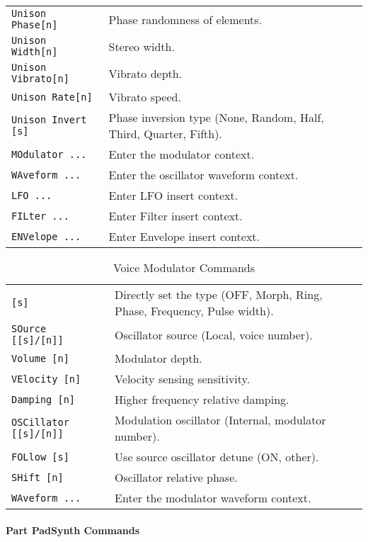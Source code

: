 \begin{table}[H]
\begin{tabular}{l l}
\texttt{Unison Phase[n]} &
   Phase randomness of elements. \\
\texttt{Unison Width[n]} &
   Stereo width. \\
\texttt{Unison Vibrato[n]} &
   Vibrato depth. \\
\texttt{Unison Rate[n]} &
   Vibrato speed. \\
\texttt{Unison Invert [s]} &
   Phase inversion type (None, Random, Half, Third, Quarter, Fifth). \\
\texttt{MOdulator ...} &
   Enter the modulator context. \\
\texttt{WAveform ...} &
   Enter the oscillator waveform context. \\
\texttt{LFO ...} &
   Enter LFO insert context.  \\
\texttt{FILter ...} &
   Enter Filter insert context.  \\
\texttt{ENVelope ...} &
   Enter Envelope insert context.   \\
      \end{tabular}
   \end{table}

   \begin{table}[H]
      \caption{Voice Modulator Commands}
      \label{table:yoshimi_part_addsynth_voice_modulator_commands}
      \begin{tabular}{l l}

\texttt{[s]} &
   Directly set the type (OFF, Morph, Ring, Phase, Frequency, Pulse width). \\
\texttt{SOurce [[s]/[n]]} &
   Oscillator source (Local, voice number). \\
\texttt{Volume [n]} &
   Modulator depth.  \\
\texttt{VElocity [n]} &
   Velocity sensing sensitivity. \\
\texttt{Damping [n]} &
   Higher frequency relative damping. \\
\texttt{OSCillator [[s]/[n]]} &
   Modulation oscillator (Internal, modulator number). \\
\texttt{FOLlow [s]} &
   Use source oscillator detune (ON, other). \\
\texttt{SHift [n]} &
   Oscillator relative phase. \\
\texttt{WAveform ...} &
   Enter the modulator waveform context. \\
      \end{tabular}
   \end{table}

\paragraph{Part PadSynth Commands}
\label{paragraph:command_line_part_padsynth_commands}

